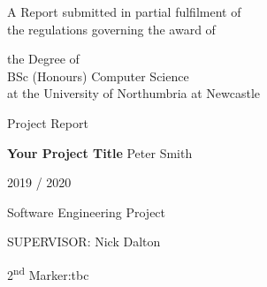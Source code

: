
\begin{titlepage}
\Large
A Report submitted in partial fulfilment of\\
 the regulations governing the award of
\par
the Degree of\\[5mm]
{\huge	 BSc (Honours) Computer Science }\\[5mm]
at the University of Northumbria at Newcastle
\par
\vspace*{1in}
{\Large Project Report}
\par\vspace{1em}
{\Huge \bfseries Your Project Title}
\vfill
Peter Smith
\par\vspace{1em}
2019 / 2020
\par\vspace{1em}
Software Engineering Project
\par\vspace{1em}
SUPERVISOR: Nick Dalton
\par
2\textsuperscript{\small nd} Marker:tbc
\end{titlepage}
